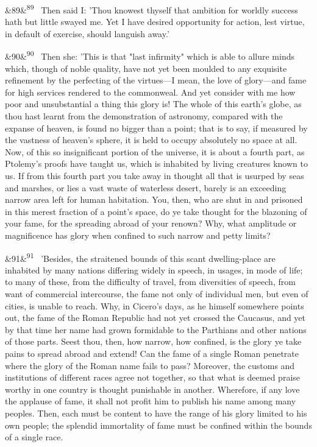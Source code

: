 \documentclass[12pt]{article}
\newcommand{\para}[1][]{\par\noindent\ifx&#1&\else\textsuperscript{\footnotesize #1}~\fi}
\begin{document}
\para[89] Then said I: 'Thou knowest thyself that ambition for worldly success hath but little swayed me. Yet I have desired opportunity for action, lest virtue, in default of exercise, should languish away.'

\para[90] Then she: 'This is that "last infirmity" which is able to allure minds which, though of noble quality, have not yet been moulded to any exquisite refinement by the perfecting of the virtues---I mean, the love of glory---and fame for high services rendered to the commonweal. And yet consider with me how poor and unsubstantial a thing this glory is! The whole of this earth's globe, as thou hast learnt from the demonstration of astronomy, compared with the expanse of heaven, is found no bigger than a point; that is to say, if measured by the vastness of heaven's sphere, it is held to occupy absolutely no space at all. Now, of this so insignificant portion of the universe, it is about a fourth part, as Ptolemy's proofs have taught us, which is inhabited by living creatures known to us. If from this fourth part you take away in thought all that is usurped by seas and marshes, or lies a vast waste of waterless desert, barely is an exceeding narrow area left for human habitation. You, then, who are shut in and prisoned in this merest fraction of a point's space, do ye take thought for the blazoning of your fame, for the spreading abroad of your renown? Why, what amplitude or magnificence has glory when confined to such narrow and petty limits?

\para[91] 'Besides, the straitened bounds of this scant dwelling-place are inhabited by many nations differing widely in speech, in usages, in mode of life; to many of these, from the difficulty of travel, from diversities of speech, from want of commercial intercourse, the fame not only of individual men, but even of cities, is unable to reach. Why, in Cicero's days, as he himself somewhere points out, the fame of the Roman Republic had not yet crossed the Caucasus, and yet by that time her name had grown formidable to the Parthians and other nations of those parts. Seest thou, then, how narrow, how confined, is the glory ye take pains to spread abroad and extend! Can the fame of a single Roman penetrate where the glory of the Roman name fails to pass? Moreover, the customs and institutions of different races agree not together, so that what is deemed praise worthy in one country is thought punishable in another. Wherefore, if any love the applause of fame, it shall not profit him to publish his name among many peoples. Then, each must be content to have the range of his glory limited to his own people; the splendid immortality of fame must be confined within the bounds of a single race.
\end{document}
